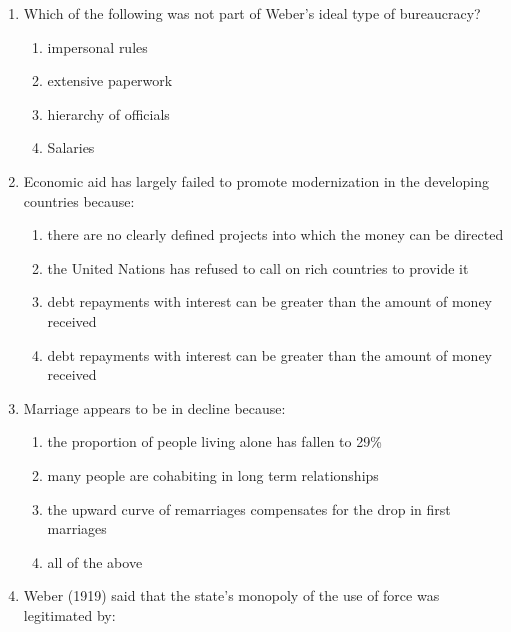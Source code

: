 \documentclass[12pt]{article}
\begin{document}
\begin{enumerate}[label=\arabic*.]
\begin{enumerate}[label=(\alph*)]
    \item they have a deep-rooted sense of ineffectiveness and are striving for control
    \item they are in pursuit of the 'perfect' body, fuelled by images of beauty
    \item they perceive a part of their body as stigmatizing, in relation to a cultural ideal
    \item their male partners pressurize them to look like supermodels
\end{enumerate}
\item Which of the following was not part of Weber's ideal type of bureaucracy?
\begin{enumerate}[label=(\alph*)]
    \item impersonal rules
    \item extensive paperwork
    \item hierarchy of officials
    \item Salaries
\end{enumerate}
\item Economic aid has largely failed to promote modernization in the developing countries because:
\begin{enumerate}[label=(\alph*)]
    \item there are no clearly defined projects into which the money can be directed
    \item the United Nations has refused to call on rich countries to provide it
    \item debt repayments with interest can be greater than the amount of money received
    \item debt repayments with interest can be greater than the amount of money received
\end{enumerate}
\item Marriage appears to be in decline because:
\begin{enumerate}[label=(\alph*)]
    \item the proportion of people living alone has fallen to 29\%
    \item many people are cohabiting in long term relationships
    \item the upward curve of remarriages compensates for the drop in first marriages
    \item all of the above
\end{enumerate}
\item Weber (1919) said that the state's monopoly of the use of force was legitimated by:
\begin{enumerate}[label=(\alph*)]

\end{enumerate}
\end{enumerate}
\end{document}
